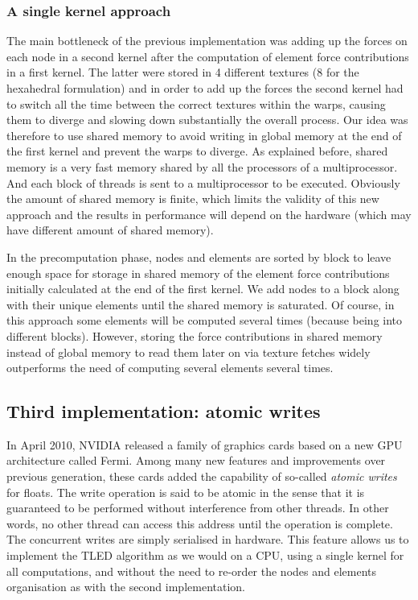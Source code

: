 \subsubsection*{A single kernel approach}
The main bottleneck of the previous implementation was adding up the forces on each node in a second kernel after the computation of element force contributions in a first kernel. The latter were stored in 4 different textures (8 for the hexahedral formulation) and in order to add up the forces the second kernel had to switch all the time between the correct textures within the warps, causing them to diverge and slowing down substantially the overall process. Our idea was therefore to use shared memory to avoid writing in global memory at the end of the first kernel and prevent the warps to diverge. As explained before, shared memory is a very fast memory shared by all the processors of a multiprocessor. And each block of threads is sent to a multiprocessor to be executed. Obviously the amount of shared memory is finite, which limits the validity of this new approach and the results in performance will depend on the hardware (which may have different amount of shared memory). 

In the precomputation phase, nodes and elements are sorted by block to leave enough space for storage in shared memory of the element force contributions initially calculated at the end of the first kernel. We add nodes to a block along with their unique elements until the shared memory is saturated. Of course, in this approach some elements will be computed several times (because being into different blocks). However, storing the force contributions in shared memory instead of global memory to read them later on via texture fetches widely outperforms the need of computing several elements several times. 


	\subsection{Third implementation: atomic writes}
In April 2010, NVIDIA released a family of graphics cards based on a new GPU architecture called Fermi. Among many new features and improvements over previous generation, these cards added the capability of so-called \emph{atomic writes} for floats. The write operation is said to be atomic in the sense that it is guaranteed to be performed without interference from other threads. In other words, no other thread can access this address until the operation is complete. The concurrent writes are simply serialised in hardware. This feature allows us to implement the TLED algorithm as we would on a CPU, using a single kernel for all computations, and without the need to re-order the nodes and elements organisation as with the second implementation. 

